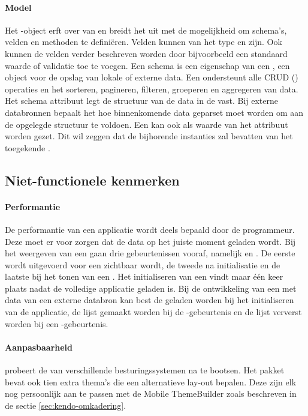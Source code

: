 \paragraph{Model}
Het -object erft over van  en breidt het uit met de mogelijkheid om schema's,  velden en methoden te definiëren.  
Velden kunnen van het type  en  zijn.
Ook kunnen de velden verder beschreven worden door bijvoorbeeld een standaard waarde of validatie toe te voegen.
Een schema is een eigenschap van een ,  een \kendo{} object voor de opslag van lokale of externe data.  
Een  ondersteunt alle CRUD () operaties en het sorteren, pagineren, filteren, groeperen en aggregeren van data.
Het schema attribuut legt de structuur van de data in de  vast.
Bij externe databronnen bepaalt het hoe binnenkomende data geparset moet worden om aan de opgelegde structuur te voldoen.
Een  kan ook als waarde van het attribuut worden gezet.
Dit wil zeggen dat de bijhorende  instanties zal bevatten van het toegekende .

\subsection{Niet-functionele kenmerken}
\label{sec:kendo-niet-functioneel}

\paragraph{Performantie}
De performantie van een \kendo{} applicatie wordt deels bepaald door de programmeur.
Deze moet er voor zorgen dat de data op het juiste moment geladen wordt.
Bij het weergeven van een  gaan drie gebeurtenissen vooraf,  namelijk  en .
De eerste wordt uitgevoerd voor een  zichtbaar wordt,  de tweede na initialisatie en de laatste bij het tonen van een .
Het initialiseren van een  vindt maar één keer plaats nadat de volledige applicatie geladen is.
Bij de ontwikkeling van een  met data van een externe databron kan best de  geladen worden bij het initialiseren van de applicatie,  de lijst gemaakt worden bij de -gebeurtenis en de lijst ververst worden bij een -gebeurtenis.

\paragraph{Aanpasbaarheid}
\kendo{} probeert de  van verschillende besturingssystemen na te bootsen.
Het \kendo{} pakket bevat ook tien extra thema's die een alternatieve lay-out bepalen.
Deze zijn elk nog persoonlijk aan te passen met de Mobile ThemeBuilder zoals beschreven in de sectie \ref{sec:kendo-omkadering}.

